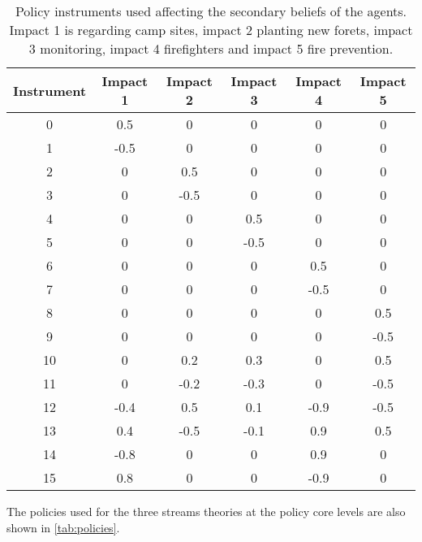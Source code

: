 \begin{table}
\begin{center}
\caption{Policy instruments used affecting the secondary beliefs of the agents. Impact 1 is regarding camp sites, impact 2 planting new forets, impact 3 monitoring, impact 4 firefighters and impact 5 fire prevention.}
\begin{tabular}{| c | c | c | c | c | c|} \hline
{\bfseries Instrument}
		& {\bfseries Impact 1}
				& {\bfseries Impact 2} 
						& {\bfseries Impact 3}
								& {\bfseries Impact 4}
										& {\bfseries Impact 5} 	\\ \hline
0 		& 0.5	& 0		& 0		& 0		& 0	\\ \hline
1 		& -0.5	& 0		& 0		& 0		& 0	\\ \hline
2		& 0		& 0.5	& 0		& 0		& 0	\\ \hline
3 		& 0		& -0.5	& 0		& 0		& 0	\\ \hline
4		& 0		& 0		& 0.5	& 0		& 0	\\ \hline
5 		& 0		& 0		& -0.5	& 0		& 0	\\ \hline
6 		& 0		& 0		& 0		& 0.5	& 0	\\ \hline
7		& 0		& 0		& 0		& -0.5	& 0	\\ \hline
8 		& 0		& 0		& 0		& 0		& 0.5\\ \hline
9 		& 0		& 0		& 0		& 0		& -0.5\\ \hline
10 		& 0		& 0.2	& 0.3	& 0		& 0.5\\ \hline
11 		& 0		& -0.2	& -0.3	& 0		& -0.5\\ \hline
12 		& -0.4	& 0.5	& 0.1		& -0.9	& -0.5\\ \hline
13 		& 0.4	& -0.5	& -0.1	& 0.9	& 0.5\\ \hline
14 		& -0.8	& 0		& 0		& 0.9	& 0	\\ \hline
15 		& 0.8	& 0		& 0		& -0.9	& 0	\\ \hline
\end{tabular}
\label{tab:policyInstruments}
\end{center}
\end{table}

The policies used for the three streams theories at the policy core levels are also shown in \autoref{tab:policies}.

